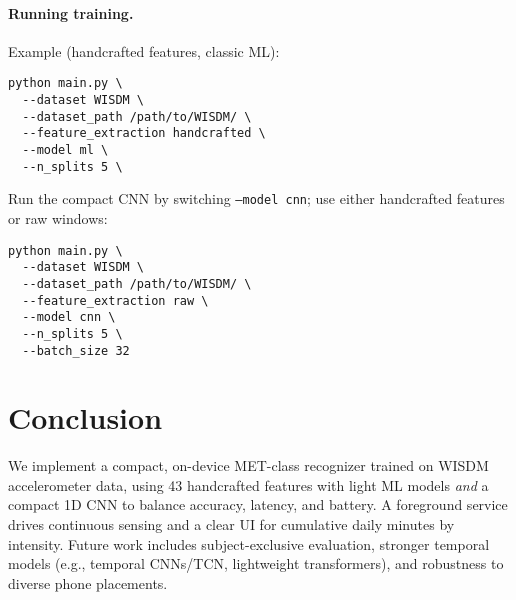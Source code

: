 \documentclass[10pt,twocolumn]{article}
\begin{document}
\paragraph{Running training.}
Example (handcrafted features, classic ML):
\begin{verbatim}
python main.py \
  --dataset WISDM \
  --dataset_path /path/to/WISDM/ \
  --feature_extraction handcrafted \
  --model ml \
  --n_splits 5 \
\end{verbatim}
Run the compact CNN by switching \texttt{--model cnn}; use either handcrafted features or raw windows:
\begin{verbatim}
python main.py \
  --dataset WISDM \
  --dataset_path /path/to/WISDM/ \
  --feature_extraction raw \
  --model cnn \
  --n_splits 5 \
  --batch_size 32
\end{verbatim}


\section{Conclusion}
We implement a compact, on-device MET-class recognizer trained on WISDM accelerometer data, using 43 handcrafted features with light ML models \emph{and} a compact 1D CNN to balance accuracy, latency, and battery. A foreground service drives continuous sensing and a clear UI for cumulative daily minutes by intensity. Future work includes subject-exclusive evaluation, stronger temporal models (e.g., temporal CNNs/TCN, lightweight transformers), and robustness to diverse phone placements.




\end{document}
